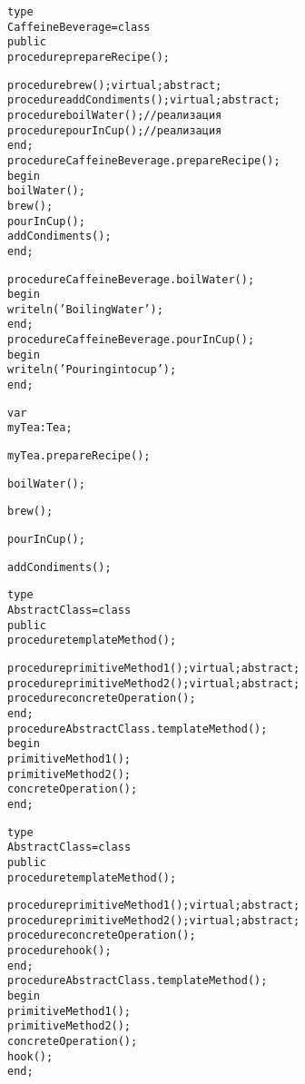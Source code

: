 \documentclass{beamer}
\begin{document}
\begin{frame}[fragile]
\begin{alltt}
type
  CaffeineBeverage = class
  public
    procedure prepareRecipe();
	
    procedure brew(); virtual; abstract;
    procedure addCondiments(); virtual; abstract;
    procedure boilWater(); //реализация
    procedure pourInCup(); //реализация    
  end;
procedure CaffeineBeverage.prepareRecipe();
begin
  boilWater();
  brew();
  pourInCup();
  addCondiments	();
end;
\end{alltt}
\end{frame}

\begin{frame}[fragile]
\begin{alltt}
procedure CaffeineBeverage.boilWater();
begin
  writeln('Boiling Water');
end;
procedure CaffeineBeverage.pourInCup();
begin
  writeln('Pouring into cup');
end;
\end{alltt}
\end{frame}

\begin{frame}[fragile]
\begin{alltt}
var
  myTea: Tea;

myTea.prepareRecipe();

boilWater();

brew();  

pourInCup();

addCondiments();
\end{alltt}
\end{frame}

\begin{frame}[fragile]
\begin{alltt}
type
  AbstractClass = class
  public
    procedure templateMethod();
	
    procedure primitiveMethod1(); virtual; abstract;
    procedure primitiveMethod2(); virtual; abstract;
    procedure concreteOperation(); 
  end;
procedure AbstractClass.templateMethod();
begin
  primitiveMethod1();
  primitiveMethod2();
  concreteOperation();
end;
\end{alltt}
\end{frame}

\begin{frame}[fragile]
\begin{alltt}
type
  AbstractClass = class
  public
    procedure templateMethod();
	
    procedure primitiveMethod1(); virtual; abstract;
    procedure primitiveMethod2(); virtual; abstract;
    procedure concreteOperation(); 
    procedure hook();     
  end;
procedure AbstractClass.templateMethod();
begin
  primitiveMethod1();
  primitiveMethod2();
  concreteOperation();
  hook();
end;
\end{alltt}
\end{frame}
\end{document}
